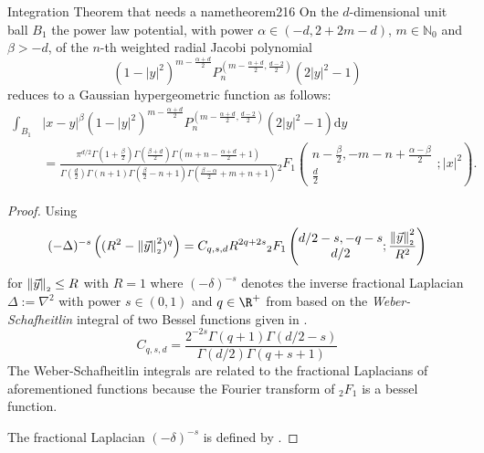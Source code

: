 \begin{theorem}{Integration Theorem that needs a name}{theorem216}
  On the $d$-dimensional unit ball $B_1$ the power law potential, with power $\alpha \in(-d,2+2m-d)$, $m\in\mathbb{N}_0$ and $\beta>-d$, of the $n$-th weighted radial Jacobi polynomial $$(1-|y|^2)^{m-\frac{\alpha+d}{2}}P_n^{\left(m-\frac{\alpha+d}{2},\frac{d-2}{2}\right)}(2|y|^2-1)$$ reduces to a Gaussian hypergeometric function as follows:
  \begin{align*}
    \int_{B_1} & |x-y|^\beta (1-|y|^2)^{m-\frac{\alpha+d}{2}} P_n^{\left(m-\frac{\alpha+d}{2},\frac{d-2}{2}\right)}(2|y|^2-1) \mathrm{d}y                                                                                                                                                                                                                                                                              \\
               & = \tfrac{\pi ^{d/2} \Gamma \left(1+\frac{\beta}{2}\right) \Gamma \left(\frac{\beta+d}{2}\right) \Gamma \left(m+n-\frac{\alpha+d}{2}+1\right)}{\Gamma \left(\frac{d}{2}\right) \Gamma (n+1) \Gamma \left(\frac{\beta}{2}-n+1\right) \Gamma \left(\frac{\beta-\alpha}{2}+m+n+1\right)}{}_2F_1\left(\begin{matrix}n-\frac{\beta}{2}, -m-n+\frac{\alpha-\beta}{2} \\\frac{d}{2}\end{matrix};|x|^2\right).
  \end{align*}
\end{theorem}

\begin{proof}
  Using
  $$(-\Delta)^{-s} \left((R^2 - \left\lVert\vec{y}\right\rVert_{\scriptscriptstyle 2}^2)^q\right) = C_{q, s, d} R^{2q+2s} {}_2F_1\left(\begin{matrix}d/2 - s, -q-s \\ d/2 \end{matrix}; \frac{\left\lVert\vec{y}\right\rVert_{\scriptscriptstyle 2}^2}{R^2}\right)$$
  for $\left\lVert\vec{y}\right\rVert_{\scriptscriptstyle 2} \le R$ with $R = 1$ where $(-\delta)^{-s}$ denotes the inverse fractional Laplacian $\Delta := \nabla^2$ with power $s \in (0, 1)$ and $q \in \R^+$
  from \cite{2014-barenblatt} based on the \textit{Weber-Schafheitlin} integral of two Bessel functions given in \cite{1945-bessel-integral}.
  $$C_{q,s,d} = \frac{2^{-2s} \Gamma(q+1) \Gamma(d/2-s)}{\Gamma(d/2) \Gamma(q+s+1)}$$
  The Weber-Schafheitlin integrals are related to the fractional Laplacians of aforementioned functions because the Fourier transform of ${}_2F_1$ is a bessel function.

  The fractional Laplacian $(-\delta)^{-s}$ is defined by \cite{2015-fractional-laplacian-definitions}.
\end{proof}

